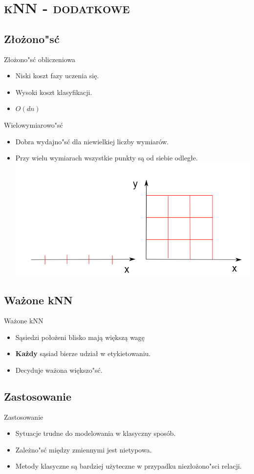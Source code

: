 \section{\scshape kNN - dodatkowe}

\subsection{Złożono"sć}
\begin{frame}{Złożono"sć obliczeniowa}
\begin{itemize}
	\item Niski koszt fazy uczenia się.
	\item Wysoki koszt klasyfikacji.
	\item $O(dn)$
\end{itemize}
\end{frame}

\begin{frame}{Wielowymiarowo"sć}
\begin{itemize}
	\item Dobra wydajno"sć dla niewielkiej liczby wymiarów.
	\item Przy wielu wymiarach wszystkie punkty są od siebie odległe.
	\includegraphics[keepaspectratio=true, scale=0.55]{dims_small}
\end{itemize}
\end{frame}


\subsection{Ważone kNN}
\begin{frame}{Ważone kNN}
\begin{itemize}
	\item Sąsiedzi położeni blisko mają większą wagę
	\item \textbf{Każdy} sąsiad bierze udział w etykietowaniu.
	\item Decyduje ważona większo"sć.
\end{itemize}
\end{frame}


\subsection{Zastosowanie}
\begin{frame}{Zastosowanie}
\begin{itemize}
	\item Sytuacje trudne do modelowania w klasyczny sposób.
	\item Zależno"sć między zmiennymi jest nietypowa.
	\item Metody klasyczne są bardziej użyteczne w przypadku niezłożono"sci relacji.
\end{itemize}
\end{frame}